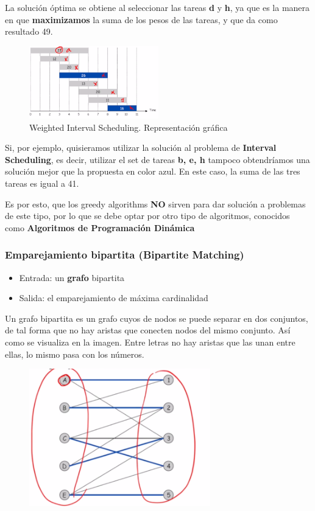 \documentclass[letterpaper, 12pt]{article}
\begin{document}
La solución óptima se obtiene al seleccionar las tareas \textbf{d} y \textbf{h}, ya que es la
manera en que \textbf{maximizamos} la suma de los pesos de las tareas, y que da como
resultado 49.

\begin{figure}[htbp!]
\centering
\includegraphics[keepaspectratio,width=0.5\textwidth]{./img/weighted_interval_scheduling.png}
\caption{\label{fig:weighted_interval_scheduling}Weighted Interval Scheduling. Representación gráfica}
\end{figure}

Si, por ejemplo, quisieramos utilizar la solución al problema de \textbf{Interval
Scheduling}, es decir, utilizar el set de tareas \textbf{b, e, h} tampoco obtendríamos
una solución mejor que la propuesta en color azul. En este caso, la suma de las
tres tareas es igual a 41.

Es por esto, que los greedy algorithms \textbf{NO} sirven para dar solución a
problemas de este tipo, por lo que se debe optar por otro tipo de algoritmos,
conocidos como \textbf{Algoritmos de Programación Dinámica}
\subsubsection{Emparejamiento bipartita (Bipartite Matching)}
\label{sec:orgc6cae4f}
\begin{itemize}
\item Entrada: un \textbf{grafo} bipartita
\item Salida: el emparejamiento de máxima cardinalidad
\end{itemize}

Un grafo bipartita es un grafo cuyos de nodos se puede separar en dos conjuntos,
de tal forma que no hay aristas que conecten nodos del mismo conjunto. Así como
se visualiza en la imagen. Entre letras no hay aristas que las unan entre ellas,
lo mismo pasa con los números.

\begin{figure}
    \includegraphics[width=0.7\textwidth, height=0.4\textwidth]
        {./img/bipartite_graph.png}
\end{figure}
\end{document}

